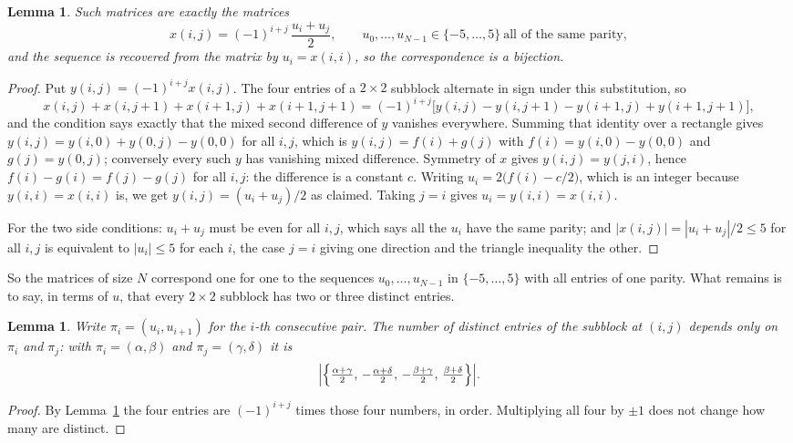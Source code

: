 \documentclass[11pt,a4paper]{article}
\theoremstyle{plain}
\newtheorem{lemma}[theorem]{Lemma}
\theoremstyle{definition}
\begin{document}
\begin{lemma}\label{lem:solve}
Such matrices are exactly the matrices
\[
x(i,j)=(-1)^{i+j}\,\frac{u_i+u_j}{2},
\qquad u_0,\dots,u_{N-1}\in\{-5,\dots,5\}\ \text{all of the same parity},
\]
and the sequence is recovered from the matrix by $u_i=x(i,i)$, so the correspondence is a
bijection.
\end{lemma}

\begin{proof}
Put $y(i,j)=(-1)^{i+j}x(i,j)$. The four entries of a $2\times2$ subblock alternate in sign
under this substitution, so
\[
x(i,j)+x(i,j{+}1)+x(i{+}1,j)+x(i{+}1,j{+}1)
=(-1)^{i+j}\bigl[y(i,j)-y(i,j{+}1)-y(i{+}1,j)+y(i{+}1,j{+}1)\bigr],
\]
and the condition says exactly that the mixed second difference of $y$ vanishes everywhere.
Summing that identity over a rectangle gives
$y(i,j)=y(i,0)+y(0,j)-y(0,0)$ for all $i,j$, which is $y(i,j)=f(i)+g(j)$ with
$f(i)=y(i,0)-y(0,0)$ and $g(j)=y(0,j)$; conversely every such $y$ has vanishing mixed
difference. Symmetry of $x$ gives $y(i,j)=y(j,i)$, hence $f(i)-g(i)=f(j)-g(j)$ for all $i,j$:
the difference is a constant $c$. Writing $u_i=2\bigl(f(i)-c/2\bigr)$, which is an integer
because $y(i,i)=x(i,i)$ is, we get $y(i,j)=(u_i+u_j)/2$ as claimed. Taking $j=i$ gives
$u_i=y(i,i)=x(i,i)$.

For the two side conditions: $u_i+u_j$ must be even for all $i,j$, which says all the $u_i$ have
the same parity; and $|x(i,j)|=|u_i+u_j|/2\le5$ for all $i,j$ is equivalent to $|u_i|\le5$
for each $i$, the case $j=i$ giving one direction and the triangle inequality the other.
\end{proof}

So the matrices of size $N$ correspond one for one to the sequences $u_0,\dots,u_{N-1}$ in
$\{-5,\dots,5\}$ with all entries of one parity. What remains is to say, in terms of $u$,
that every $2\times2$ subblock has two or three distinct entries.

\begin{lemma}\label{lem:block}
Write $\pi_i=(u_i,u_{i+1})$ for the $i$-th consecutive pair. The number of distinct entries of
the subblock at $(i,j)$ depends only on $\pi_i$ and $\pi_j$: with $\pi_i=(\alpha,\beta)$ and
$\pi_j=(\gamma,\delta)$ it is
\[
\Bigl|\Bigl\{\tfrac{\alpha+\gamma}{2},\,-\tfrac{\alpha+\delta}{2},\,
-\tfrac{\beta+\gamma}{2},\,\tfrac{\beta+\delta}{2}\Bigr\}\Bigr| .
\]
\end{lemma}

\begin{proof}
By Lemma~\ref{lem:solve} the four entries are $(-1)^{i+j}$ times those four numbers, in
order. Multiplying all four by $\pm1$ does not change how many are distinct.
\end{proof}
\end{document}
